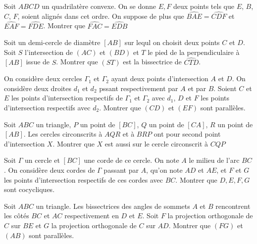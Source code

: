 \begin{exo} Soit $ABCD$ un quadrilatère convexe. On se donne $E, F$ deux points tels que $E$, $B$, $C$, $F$, soient alignés dans cet ordre. On suppose de plus que $\widehat{BAE} = \widehat{CDF}$ et $\widehat{EAF} = \widehat{FDE}$. Montrer que $\widehat{FAC}=\widehat{EDB}$
\end{exo}

\begin{exo} Soit un demi-cercle de diamètre $[AB]$ sur lequl on choisit deux points $C$ et $D$. Soit $S$ l'intersection de $(AC)$ et $(BD)$ et $T$ le pied de la perpendiculaire à $[AB]$ issue de $S$. Montrer que $(ST)$ est la bissectrice de $\widehat{CTD}$.
\end{exo}

\begin{exo} On considère deux cercles $\Gamma_1$ et $\Gamma_2$ ayant deux points d'intersection $A$ et $D$. On considère deux droites $d_1$ et $d_2$ pssant respectivement par $A$ et par $B$. Soient $C$ et $E$ les points d'intersection respectifs de $\Gamma_1$ et $\Gamma_2$ avec $d_1$, $D$ et $F$ les points d'intersection respectifs avec $d_2$. Montrer que $(CD)$ et $(EF)$ sont parallèles.
\end{exo}

\begin{exo} Soit $ABC$ un triangle, $P$ un point de $[BC]$, $Q$ un point de $[CA]$, $R$ un point de $[AB]$. Les cercles circonscrits à $AQR$ et à $BRP$ ont pour second point d'intersection $X$.
Montrer que $X$ est aussi sur le cercle circonscrit à $CQP$
\end{exo}

\begin{exo} Soit $\Gamma$ un cercle et $[BC]$ une corde de ce cercle. On note $A$ le milieu de l'arc $BC$. On considère deux cordes de $\Gamma$ passant par $A$, qu'on note $AD$ et $AE$, et $F$ et $G$ les points d'intersection respectifs de ces cordes avec $BC$. Montrer que $D, E, F, G$ sont cocycliques.
\end{exo}

\begin{exo} Soit $ABC$ un triangle. Les bissectrices des angles de sommets $A$ et $B$ rencontrent les côtés $BC$ et $AC$ respectivement en $D$ et $E$. Soit $F$ la projection orthogonale de $C$ sur $BE$ et $G$ la projection orthogonale de $C$ sur $AD$. Montrer que $(FG)$ et $(AB)$ sont parallèles.
\end{exo}

